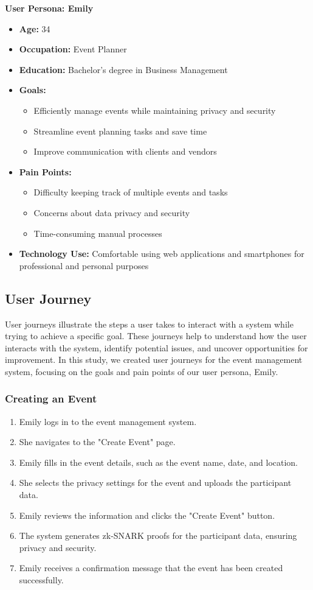 \textbf{User Persona: Emily}
\begin{itemize}
\item \textbf{Age:} 34
\item \textbf{Occupation:} Event Planner
\item \textbf{Education:} Bachelor's degree in Business Management
\item \textbf{Goals:}
\begin{itemize}
\item Efficiently manage events while maintaining privacy and security
\item Streamline event planning tasks and save time
\item Improve communication with clients and vendors
\end{itemize}
\item \textbf{Pain Points:}
\begin{itemize}
\item Difficulty keeping track of multiple events and tasks
\item Concerns about data privacy and security
\item Time-consuming manual processes
\end{itemize}
\item \textbf{Technology Use:} Comfortable using web applications and smartphones for professional and personal purposes
\end{itemize}

\subsection{User Journey}
User journeys illustrate the steps a user takes to interact with a system while trying to achieve a specific goal. These journeys help to understand how the user interacts with the system, identify potential issues, and uncover opportunities for improvement. In this study, we created user journeys for the event management system, focusing on the goals and pain points of our user persona, Emily.

\subsubsection{Creating an Event}
\begin{enumerate}
\item Emily logs in to the event management system.
\item She navigates to the "Create Event" page.
\item Emily fills in the event details, such as the event name, date, and location.
\item She selects the privacy settings for the event and uploads the participant data.
\item Emily reviews the information and clicks the "Create Event" button.
\item The system generates zk-SNARK proofs for the participant data, ensuring privacy and security.
\item Emily receives a confirmation message that the event has been created successfully.
\end{enumerate}

